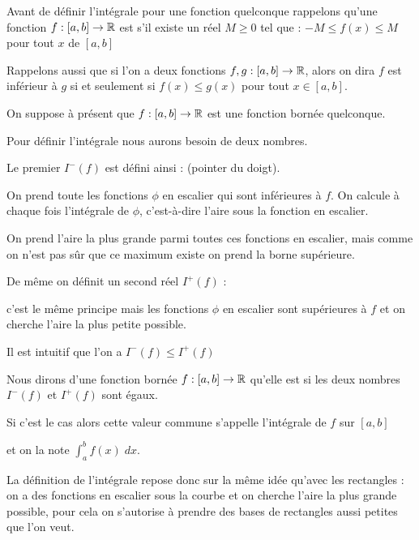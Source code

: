 \diapo

Avant de définir l'intégrale pour une fonction quelconque rappelons qu'une fonction
 $f : [a,b] \to \mathbb{R}$ est  s'il existe un réel $M\ge0$ tel que :
$-M \le f(x) \le M$ pour tout $x$ de $[a,b]$

\change

Rappelons aussi que si l'on a deux fonctions $f,g : [a,b] \to \mathbb{R}$, alors on dira 
$f$ est inférieur à $g$ si et seulement si $ f(x) \le g(x)$ pour tout $x\in [a,b]$.

\change

On suppose à présent que $f : [a,b] \to \mathbb{R}$ est une fonction bornée quelconque.

\change

Pour définir l'intégrale nous aurons besoin de deux nombres.

Le premier $I^-(f)$ est défini ainsi : (pointer du doigt).

On prend toute les fonctions $\phi$ en escalier qui sont inférieures à $f$.
On calcule à chaque fois l'intégrale de $\phi$, c'est-à-dire l'aire sous la fonction en escalier.

On prend l'aire la plus grande parmi toutes ces fonctions en escalier,
mais comme on n'est pas sûr que ce maximum existe on prend la borne supérieure.


\change

De même on définit un second réel $I^+(f)$ :

c'est le même principe mais les fonctions $\phi$ en escalier sont supérieures à $f$
et on cherche l'aire la plus petite possible.


\change

Il est intuitif que l'on a $I^-(f) \le I^+(f)$


\change

Nous dirons d'une fonction bornée $f :[a,b] \to \mathbb{R}$ qu'elle est 
si les deux nombres $I^-(f)$ et $I^+(f)$ sont égaux.

\change

Si c'est le cas alors cette valeur commune s'appelle l'intégrale de $f$ sur $[a,b]$ 

et on la note $\int_a^b f(x)\; dx$.



\diapo

La définition de l'intégrale repose donc sur la même idée qu'avec les rectangles :
on a des fonctions en escalier sous la courbe et on cherche l'aire la plus grande possible, pour cela on s'autorise 
à prendre des bases de rectangles aussi petites que l'on veut.

